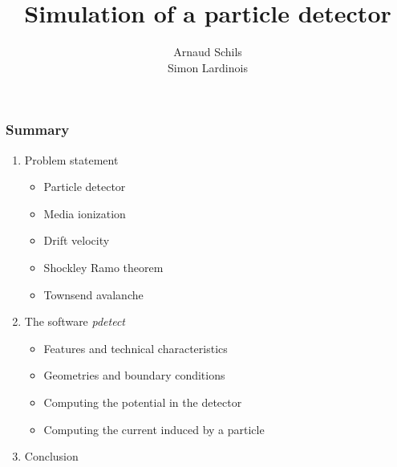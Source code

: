 \documentclass[14pt]{beamer}
\begin{document}
  {
\begin{frame}

\title{Simulation of a particle detector}
\author{Arnaud Schils \\ Simon Lardinois}
\maketitle

\end{frame}
}

\begin{frame}
\frametitle{Summary}

\begin{enumerate}
  \setlength\itemsep{1.4em}
  \item Problem statement
  \begin{itemize}
    \item Particle detector
    \item Media ionization
    \item Drift velocity
    \item Shockley Ramo theorem
    \item Townsend avalanche
  \end{itemize}
  \item The software \textit{pdetect}
  \begin{itemize}
    \item Features and technical characteristics
    \item Geometries and boundary conditions
    \item Computing the potential in the detector
    \item Computing the current induced by a particle
  \end{itemize}
  \item Conclusion
\end{enumerate}
\end{frame}
\end{document}
